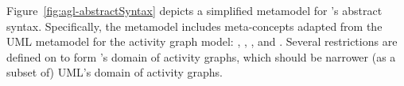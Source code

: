Figure~\ref{fig:agl-abstractSyntax} depicts a simplified metamodel for \agl's abstract syntax. Specifically, the \agl metamodel includes meta-concepts adapted from the UML metamodel for the activity graph model: , , , and . Several restrictions are defined on  to form \agl's domain of activity graphs, which should be narrower (as a subset of) UML's domain of activity graphs.

